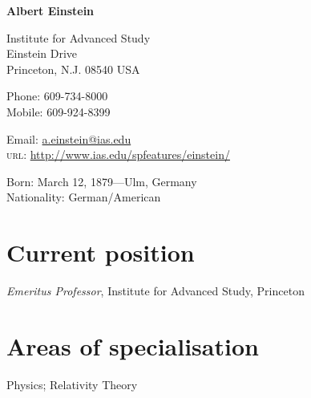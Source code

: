 \documentclass[11pt]{article} %
\begin{document}

{\LARGE\bfseries Albert Einstein} %
\bigskip\bigskip\medskip %

Institute for Advanced Study\\ %
Einstein Drive\\ Princeton, N.J. 08540 USA
\medskip %

Phone: 609-734-8000\\ %
Mobile: 609-924-8399 %
\medskip %

Email: \href{mailto:a.einstein@ias.edu}{a.einstein@ias.edu}\\ %
\textsc{url}: \href{http://www.ias.edu/spfeatures/einstein/}{http://www.ias.edu/spfeatures/einstein/}\\ %

\vspace{0.06\textheight} %


Born: March 12, 1879---Ulm, Germany\\ %
Nationality: German/American %


\section*{Current position}

\emph{Emeritus Professor}, Institute for Advanced Study, Princeton %


\section*{Areas of specialisation}

Physics; Relativity Theory %

\end{document}
